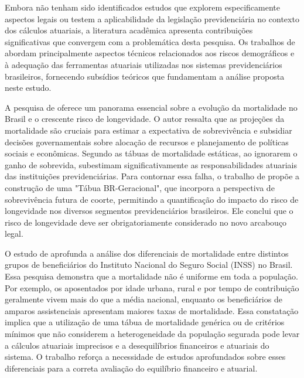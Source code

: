 Embora não tenham sido identificados estudos que explorem especificamente aspectos legais ou testem a aplicabilidade da legislação previdenciária no contexto dos cálculos atuariais, a literatura acadêmica apresenta contribuições significativas que convergem com a problemática desta pesquisa. Os trabalhos de  abordam principalmente aspectos técnicos relacionados aos riscos demográficos e à adequação das ferramentas atuariais utilizadas nos sistemas previdenciários brasileiros, fornecendo subsídios teóricos que fundamentam a análise proposta neste estudo.

A pesquisa de  oferece um panorama essencial sobre a evolução da mortalidade no Brasil e o crescente risco de longevidade. O autor ressalta que as projeções da mortalidade são cruciais para estimar a expectativa de sobrevivência e subsidiar decisões governamentais sobre alocação de recursos e planejamento de políticas sociais e econômicas. Segundo  as tábuas de mortalidade estáticas, ao ignorarem o ganho de sobrevida, subestimam significativamente as responsabilidades atuariais das instituições previdenciárias. Para contornar essa falha, o trabalho de  propõe a construção de uma "Tábua BR-Geracional", que incorpora a perspectiva de sobrevivência futura de coorte, permitindo a quantificação do impacto do risco de longevidade nos diversos segmentos previdenciários brasileiros. Ele conclui que o risco de longevidade deve ser obrigatoriamente considerado no novo arcabouço legal.

O estudo de  aprofunda a análise dos diferenciais de mortalidade entre distintos grupos de beneficiários do Instituto Nacional do Seguro Social (INSS) no Brasil. Essa pesquisa demonstra que a mortalidade não é uniforme em toda a população. Por exemplo, os aposentados por idade urbana, rural e por tempo de contribuição geralmente vivem mais do que a média nacional, enquanto os beneficiários de amparos assistenciais apresentam maiores taxas de mortalidade. Essa constatação implica que a utilização de uma tábua de mortalidade genérica ou de critérios mínimos que não considerem a heterogeneidade da população segurada pode levar a cálculos atuariais imprecisos e a desequilíbrios financeiros e atuariais do sistema. O trabalho reforça a necessidade de estudos aprofundados sobre esses diferenciais para a correta avaliação do equilíbrio financeiro e atuarial.

